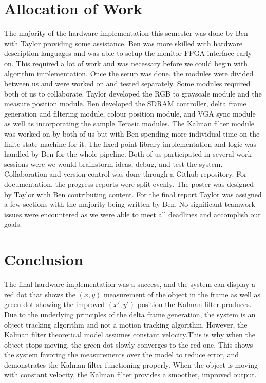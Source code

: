 \documentclass[11pt]{article} %
\begin{document}
\section{Allocation of Work}
The majority of the hardware implementation this semester was done by Ben with Taylor providing some assistance. Ben was more skilled with hardware description languages and was able to setup the monitor-FPGA interface early on. This required a lot of work and was necessary before we could begin with algorithm implementation. Once the setup was done, the modules were divided between us and were worked on and tested separately. Some modules required both of us to collaborate. Taylor developed the RGB to grayscale module and the measure position module. Ben developed the SDRAM controller, delta frame generation and filtering module, colour position module, and VGA sync module as well as incorporating the sample Terasic modules. The Kalman filter module was worked on by both of us but with Ben spending more individual time on the finite state machine for it. The fixed point library implementation and logic was handled by Ben for the whole pipeline. Both of us participated in several work sessions were we would brainstorm ideas, debug, and test the system. Collaboration and version control was done through a Github repository. For documentation, the progress reports were split evenly. The poster was designed by Taylor with Ben contributing content. For the final report Taylor was assigned a few sections with the majority being written by Ben. No significant teamwork issues were encountered as we were able to meet all deadlines and accomplish our goals.
\section{Conclusion}
The final hardware implementation was a success, and the system can display a red dot that shows the $(x,y)$ measurement of the object in the frame as well as green dot showing the improved $(x',y')$ position the Kalman filter produces. Due to the underlying principles of the delta frame generation, the system is an object tracking algorithm and not a motion tracking algorithm. However, the Kalman filter theoretical model assumes constant velocity.This is why when the object stops moving, the green dot slowly converges to the red one. This shows the system favoring the measurements over the model to reduce error, and demonstrates the Kalman filter functioning properly. When the object is moving with constant velocity, the Kalman filter provides a smoother, improved output.
\end{document}

